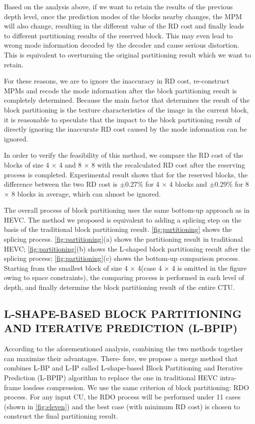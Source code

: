\documentclass[journal]{IEEEtran}
\begin{document}
Based on the analysis above, if we want to retain the results of the previous depth level, once the prediction modes of the blocks nearby changes, the MPM will also change, resulting in the different value of the RD cost and finally leads to different partitioning results of the reserved block. This may even lead to wrong mode information decoded by the decoder and cause serious distortion. This is equivalent to overturning the original partitioning result which we want to retain.

For these reasons, we are to ignore the inaccuracy in RD cost, re-construct MPMs and recode the mode information after the block partitioning result is completely determined. Because the main factor that determines the result of the block partitioning is the texture characteristics of the image in the current block, it is reasonable to speculate that the impact to the block partitioning result of directly ignoring the inaccurate RD cost caused by the mode information can be ignored. 

In order to verify the feasibility of this method, we compare the RD cost of the blocks of size 4 × 4 and 8 × 8 with the recalculated RD cost after the reserving process is completed. Experimental result shows that for the reserved blocks, the difference between the two RD cost is $\pm$0.27\% for 4 × 4 blocks and $\pm $0.29\% for 8 × 8 blocks in average, which can almost be ignored. 

The overall process of block partitioning uses the same bottom-up approach as in HEVC. The method we proposed is equivalent to adding a splicing step on the basis of the traditional block partitioning result. \autoref{fig:partitioning} shows the splicing process. \autoref{fig:partitioning}(a) shows the partitioning result in traditional HEVC; \autoref{fig:partitioning}(b) shows the L-shaped block partitioning result after the splicing process; \autoref{fig:partitioning}(c) shows the bottom-up comparison process. Starting from the smallest block of size 4 × 4(case 4 × 4 is omitted in the figure owing to space constraints), the comparing process is performed in each level of depth, and finally determine the block partitioning result of the entire CTU.

\subsection{L-SHAPE-BASED BLOCK PARTITIONING AND ITERATIVE PREDICTION (L-BPIP)}
According to the aforementioned analysis, combining the two methods together can maximize their advantages. There- fore, we propose a merge method that combines L-BP and L-IP called L-shape-based Block Partitioning and Iterative Prediction (L-BPIP) algorithm to replace the one in traditional HEVC intra-frame lossless compression. We use the same criterion of block partitioning: RDO process. For any input CU, the RDO process will be performed under 11 cases (shown in \autoref{fig:eleven}) and the best case (with minimum RD cost) is chosen to construct the final partitioning result.
\end{document}
